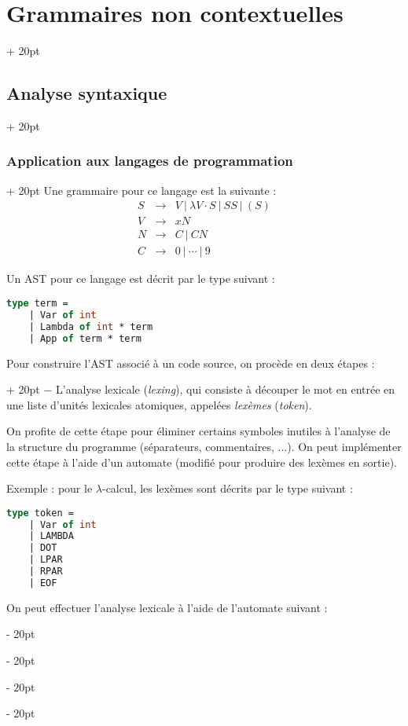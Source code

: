 \documentclass[a4paper, 12pt, twoside]{article}
\newcommand{\ind}[1][20pt]{\advance\leftskip + #1}
\newcommand{\deind}[1][20pt]{\advance\leftskip - #1}
\newenvironment{indt}[2][20pt]{#2 \par \ind[#1]}{\par \deind} %
\begin{document}
\begin{indt}{\section{Grammaires non contextuelles}}
\begin{indt}{\subsection{Analyse syntaxique}}
\begin{indt}{\subsubsection{Application aux langages de programmation}}
                Une grammaire pour ce langage est la suivante :
                \[
                    \begin{array}{rcl}
                        S & \rightarrow & V \ |\ \lambda V \cdot S\ |\ S S \ |\ (S)
                        \\
                        V & \rightarrow & xN
                        \\
                        N & \rightarrow & C \ |\ CN
                        \\
                        C & \rightarrow & 0\ |\ \cdots \ |\ 9
                    \end{array}
                \]

                Un AST pour ce langage est décrit par le type suivant :
                \begin{lstlisting}[language=Caml, xleftmargin=80pt]
type term =
    | Var of int
    | Lambda of int * term
    | App of term * term\end{lstlisting}

                \vspace{6pt}
                
                \begin{indt}{Pour construire l'AST associé à un code source, on procède en deux étapes :}
                    $-$ L'analyse lexicale (\textit{lexing}), qui consiste à découper le mot en entrée en une liste d'unités lexicales atomiques, appelées \emph{lexèmes} (\textit{token}).

                    On profite de cette étape pour éliminer certains symboles inutiles à l'analyse de la structure du programme (séparateurs, commentaires, ...).
                    On peut implémenter cette étape à l'aide d'un automate (modifié pour produire des lexèmes en sortie).

                    \vspace{6pt}
                    
                    Exemple : pour le $\lambda$-calcul, les lexèmes sont décrits par le type suivant :
                    \begin{lstlisting}[language=Caml, xleftmargin=100pt]
type token =
    | Var of int
    | LAMBDA
    | DOT
    | LPAR
    | RPAR
    | EOF\end{lstlisting}

                    On peut effectuer l'analyse lexicale à l'aide de l'automate suivant :


\end{indt}
\end{indt}
\end{indt}
\end{indt}
\end{document}
